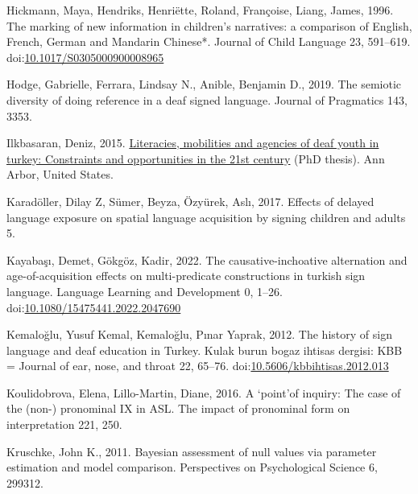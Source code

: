 \documentclass[]{elsarticle} %
\newlength{\cslhangindent}
\newenvironment{CSLReferences}[2] %
 {%
  \setlength{\parindent}{0pt}
  \ifodd #1 \everypar{\setlength{\hangindent}{\cslhangindent}}\ignorespaces\fi
  \ifnum #2 > 0
  \setlength{\parskip}{#2\baselineskip}
  \fi
 }%
 {}
\begin{document}
\begin{CSLReferences}{1}{0}
\leavevmode{}%
Hickmann, Maya, Hendriks, Henriëtte, Roland, Françoise, Liang, James,
1996. The marking of new information in children's narratives: a
comparison of English, French, German and Mandarin Chinese*. Journal of
Child Language 23, 591--619.
doi:\href{https://doi.org/10.1017/S0305000900008965}{10.1017/S0305000900008965}

\leavevmode{}%
Hodge, Gabrielle, Ferrara, Lindsay N., Anible, Benjamin D., 2019. The
semiotic diversity of doing reference in a deaf signed language. Journal
of Pragmatics 143, 3353.

\leavevmode{}%
Ilkbasaran, Deniz, 2015.
\href{https://www.proquest.com/docview/1656169535/abstract/16EA71911A644FC3PQ/1}{Literacies,
mobilities and agencies of deaf youth in turkey: Constraints and
opportunities in the 21st century} (PhD thesis). Ann Arbor, United
States.

\leavevmode{}%
Karadöller, Dilay Z, Sümer, Beyza, Özyürek, Aslı, 2017. Effects of
delayed language exposure on spatial language acquisition by signing
children and adults 5.

\leavevmode{}%
Kayabaşı, Demet, Gökgöz, Kadir, 2022. The causative-inchoative
alternation and age-of-acquisition effects on multi-predicate
constructions in turkish sign language. Language Learning and
Development 0, 1--26.
doi:\href{https://doi.org/10.1080/15475441.2022.2047690}{10.1080/15475441.2022.2047690}

\leavevmode{}%
Kemaloğlu, Yusuf Kemal, Kemaloğlu, Pınar Yaprak, 2012. The history of
sign language and deaf education in Turkey. Kulak burun bogaz ihtisas
dergisi: KBB = Journal of ear, nose, and throat 22, 65--76.
doi:\href{https://doi.org/10.5606/kbbihtisas.2012.013}{10.5606/kbbihtisas.2012.013}

\leavevmode{}%
Koulidobrova, Elena, Lillo-Martin, Diane, 2016. A {`}point{'}of inquiry:
The case of the (non-) pronominal IX in ASL. The impact of pronominal
form on interpretation 221, 250.

\leavevmode{}%
Kruschke, John K., 2011. Bayesian assessment of null values via
parameter estimation and model comparison. Perspectives on Psychological
Science 6, 299312.


\end{CSLReferences}
\end{document}
